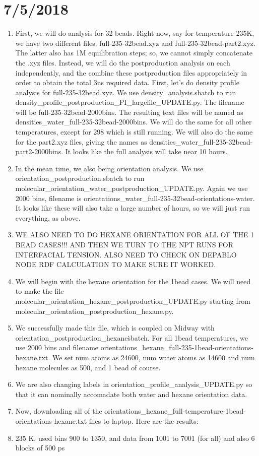 \documentclass[12pt,reqno]{amsart}
\numberwithin{equation}{section}
\begin{document}
\section{7/5/2018}
\begin{enumerate}
\item First, we will do analysis for 32 beads.  Right now, say for temperature 235K, we have two different files.  full-235-32bead.xyz and full-235-32bead-part2.xyz.  The latter also has 1M equilibration steps; so, we cannot simply concatenate the .xyz files.  Instead, we will do the postproduction analysis on each independently, and the combine these postproduction files appropriately in order to obtain the total 3ns required data.  First, let's do density profile analysis for full-235-32bead.xyz.  We use density\_analysis.sbatch to run density\_profile\_postproduction\_PI\_largefile\_UPDATE.py.  The filename will be full-235-32bead-2000bins.  The resulting text files will be named as densities\_water\_full-235-32bead-2000bins.  We will do the same for all other temperatures, except for 298 which is still running.  We will also do the same for the part2.xyz files, giving the names as densities\_water\_full-235-32bead-part2-2000bins.  It looks like the full analysis will take near 10 hours.   
\item In the mean time, we also being orientation analysis.  We use orientation\_postproduction.sbatch to run molecular\_orientation\_water\_postproduction\_UPDATE.py.  Again we use 2000 bins, filename is orientations\_water\_full-235-32bead-orientations-water.  It looks like these will also take a large number of hours, so we will just run everything, as above.    
\item WE ALSO NEED TO DO HEXANE ORIENTATION FOR ALL OF THE 1 BEAD CASES!!!  AND THEN WE TURN TO THE NPT RUNS FOR INTERFACIAL TENSION.  ALSO NEED TO CHECK ON DEPABLO NODE RDF CALCULATION TO MAKE SURE IT WORKED. 
\item We will begin with the hexane orientation for the 1bead cases.  We will need to make the file molecular\_orientation\_hexane\_postproduction\_UPDATE.py starting from molecular\_orientation\_postproduction\_hexane.py.    
\item We successfully made this file, which is coupled on Midway with orientation\_postproduction\_hexane\.sbatch.  For all 1bead temperatures, we use 2000 bins and filename orientations\_hexane\_full-235-1bead-orientations-hexane.txt.  We set num atoms as 24600, num water atoms as 14600 and num hexane molecules as 500, and 1 bead of course.  
\item We are also changing labels in orientation\_profile\_analysis\_UPDATE.py so that it can nominally accomadate both water and hexane orientation data.  
\item Now, downloading all of the orientations\_hexane\_full-temperature-1bead-orientations-hexane.txt files to laptop.  Here are the results:
\item 235 K, used bins 900 to 1350, and data from 1001 to 7001 (for all) and also 6 blocks of 500 ps


\end{enumerate}
\end{document}
